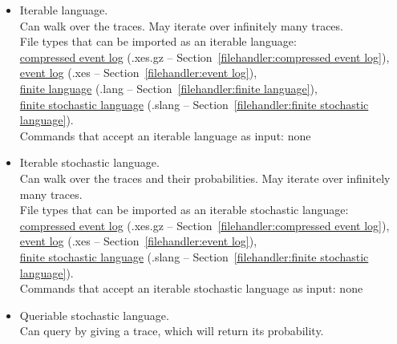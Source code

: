 {\begin{itemize}
\item Iterable language.
\\Can walk over the traces. May iterate over infinitely many traces.
\\File types that can be imported as an iterable language: \\\null\qquad\hyperref[filehandler:compressed event log]{compressed event log} (.xes.gz -- Section~\ref{filehandler:compressed event log}), \\\null\qquad\hyperref[filehandler:event log]{event log} (.xes -- Section~\ref{filehandler:event log}), \\\null\qquad\hyperref[filehandler:finite language]{finite language} (.lang -- Section~\ref{filehandler:finite language}), \\\null\qquad\hyperref[filehandler:finite stochastic language]{finite stochastic language} (.slang -- Section~\ref{filehandler:finite stochastic language}).
\\Commands that accept an iterable language as input: none
\item Iterable stochastic language.
\\Can walk over the traces and their probabilities. May iterate over infinitely many traces.
\\File types that can be imported as an iterable stochastic language: \\\null\qquad\hyperref[filehandler:compressed event log]{compressed event log} (.xes.gz -- Section~\ref{filehandler:compressed event log}), \\\null\qquad\hyperref[filehandler:event log]{event log} (.xes -- Section~\ref{filehandler:event log}), \\\null\qquad\hyperref[filehandler:finite stochastic language]{finite stochastic language} (.slang -- Section~\ref{filehandler:finite stochastic language}).
\\Commands that accept an iterable stochastic language as input: none
\item Queriable stochastic language.
\\Can query by giving a trace, which will return its probability.

\end{itemize}}

